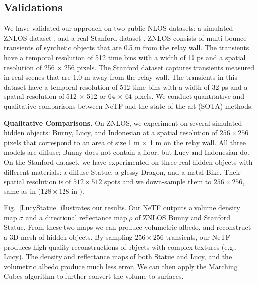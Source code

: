\documentclass[10pt,journal,compsoc]{IEEEtran}
\begin{document}
\subsection{Validations}
We have validated our approach on two public NLOS datasets: a simulated ZNLOS dataset \cite{2014Jarabo, 2019Galindo}, and a real Stanford dataset \cite{2019FK}. ZNLOS consists of multi-bounce transients of synthetic objects that are 0.5 m from the relay wall. The transients have a temporal resolution of 512 time bins with a width of 10 ps and a spatial resolution of 256 $\times$ 256 pixels. The Stanford dataset captures transients measured in real scenes that are 1.0 m away from the relay wall. The transients in this dataset have a temporal resolution of 512 time bins with a width of 32 ps and a spatial resolution of 512 × 512 or 64 × 64 pixels. We conduct quantitative and qualitative comparisons between NeTF and the state-of-the-art (SOTA) methods. 

\textbf{Qualitative Comparisons.}
On ZNLOS, we experiment on several simulated hidden objects: Bunny, Lucy, and Indonesian at a spatial resolution of $256 \times 256$ pixels that correspond to an area of size 1 m $\times$ 1 m on the relay wall. All three models are diffuse; Bunny does not contain a floor, but Lucy and Indonesian do. 
On the Stanford dataset, we have experimented on three real hidden objects with different materials: a diffuse Statue, a glossy Dragon, and a metal Bike. Their spatial resolution is of $512 \times 512$ spots and we down-sample them to $256 \times 256$, same as in \cite{2020DLCT} ($128\times128$ in \cite{2019FK, 2019Liu}).

Fig.~\ref{LucyStatue} illustrates our results. Our NeTF outputs a volume density map $\sigma$ and a directional reflectance map $\rho$ of ZNLOS Bunny and Stanford Statue. From these two maps we can produce volumetric albedo, and reconstruct a 3D mesh of hidden objects. By sampling $256\times256$ transients, our NeTF produces high quality reconstructions of objects with complex textures (e.g., Lucy). The density and reflectance maps of both Statue and Lucy, and the volumetric albedo produce much less error. We can then apply the Marching Cubes algorithm to further convert the volume to surfaces. 
\end{document}
